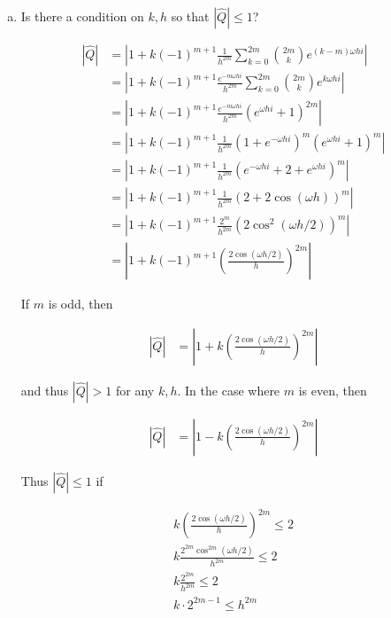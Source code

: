 \documentclass[11pt]{amsart}
\numberwithin{equation}{section}
\begin{document}
\begin{enumerate}[a)]
    \item Is there a condition on $k, h$ so that $|\hat{Q}| \le 1$? \\
          
          {\color{blue}
          \begin{align}
              |\hat Q| & = \left| 1 + k (-1)^{m+1} \frac{1}{h^{2m}} \sum_{k=0}^{2m} \binom{2m}{k} e^{(k-m)\omega hi} \right|            \\ 
                       & = \left| 1 + k (-1)^{m+1} \frac{e^{-m\omega hi}}{h^{2m}} \sum_{k=0}^{2m} \binom{2m}{k} e^{k\omega hi} \right|  \\ 
                       & = \left| 1 + k (-1)^{m+1} \frac{e^{-m\omega hi}}{h^{2m}} (e^{\omega hi} + 1)^{2m} \right|                      \\ 
                       & = \left| 1 + k (-1)^{m+1} \frac{1}{h^{2m}} (1 + e^{-\omega hi})^m (e^{\omega hi} + 1)^m \right|                \\ 
                       & = \left| 1 + k (-1)^{m+1} \frac{1}{h^{2m}} (e^{-\omega hi} + 2 + e^{\omega hi})^m \right|                      \\ 
                       & = \left| 1 + k (-1)^{m+1} \frac{1}{h^{2m}} (2 + 2\cos(\omega h))^m \right|                                     \\ 
                       & = \left| 1 + k (-1)^{m+1} \frac{2^m}{h^{2m}} (2\cos^2(\omega h/2))^m \right|                                   \\ 
                       & = \left| 1 + k (-1)^{m+1} \left( \frac{2 \cos(\omega h/2)}{h}\right)^{2m} \right|                             
          \end{align}
          
          If $m$ is odd, then
          
          \begin{align}
              |\hat Q| & = \left| 1 + k \left( \frac{2 \cos(\omega h/2)}{h}\right)^{2m} \right|  
          \end{align}
          
          and thus $|\hat Q| > 1$ for any $k, h$. In the case where $m$ is even, then
          
          \begin{align}
              |\hat Q| & = \left| 1 - k \left( \frac{2 \cos(\omega h/2)}{h}\right)^{2m} \right| 
          \end{align}
          
          Thus $|\hat Q| \le 1$ if
          
          \begin{align}
              k \left( \frac{2 \cos(\omega h/2)}{h}\right)^{2m} \le 2 \\
              k \frac{2^{2m} \cos^{2m}(\omega h/2)}{h^{2m}} \le 2     \\
              k \frac{2^{2m}}{h^{2m}} \le 2                           \\
              k \cdot 2^{2m-1} \le h^{2m}
          \end{align}
          }
          
\end{enumerate}
\end{document}
